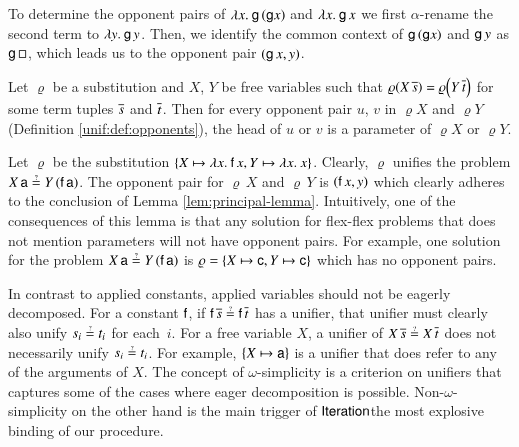 \begin{exa} To determine the opponent pairs of $\lambda x.\> \mathsf{g} \, (\mathsf{g} x)$
  and $\lambda x.\> \mathsf{g} \, x$ we first $\alpha$-rename the second term to 
  $\lambda y.\> \mathsf{g}\,{y}$. Then, we identify the common context of $\mathsf{g} \, (\mathsf{g} x)$ and $\mathsf{g} \, y$
  as $\mathsf{g} \, \square $, which leads us to the opponent pair $(\mathsf{g} \, x, y)$.
\end{exa}

\begin{lemma}[$\jp L{3\text{ (1)}}$]\label{lem:principal-lemma}Let $\varrho$ be a substitution
    and $X$, $Y$ be free variables such that $\varrho\left(X\,\seq s\right)=\varrho\left(Y\,\seq t\right)$
    for some term tuples $\overline{s}$ and $\overline{t}$. Then for every opponent
    pair $u$, $v$ in $\varrho X$ and $\varrho Y$
    (Definition \ref{unif:def:opponents}), the head of $u$ or $v$ is a parameter
    of $\varrho X$ or $\varrho Y$.
    \end{lemma}
\begin{exa}
  Let $\varrho$ be the substitution $\{ X \mapsto \lambda x.\> \mathsf{f} \, x, Y
  \mapsto \lambda x.\> x \}$. Clearly, $\varrho$ unifies the problem $X \, \cst{a}
  \unif Y \, (\cst{f} \, \cst{a})$. The opponent pair for $\varrho\,X$ and $\varrho\,Y$
  is $(\mathsf{f} \, x, y)$ which clearly adheres to the conclusion of Lemma \ref{lem:principal-lemma}.
%
  Intuitively, one of the consequences of this lemma is that any solution for
  flex-flex problems that does not mention parameters will not have opponent pairs. 
  For example, one solution for the 
  problem $X \, \cst{a}
  \unif Y \, (\cst{f} \, \cst{a})$ is $\varrho = \{ X \mapsto \mathsf{c}, Y \mapsto \mathsf{c} \}$
  which has no opponent pairs.
\end{exa}
  
  In contrast to applied constants, applied variables should not be eagerly decomposed.
  For a constant $\mathsf{f}$, if $\cst{f}\,\seq s \unif \cst{f}\,\seq t$ has a unifier,
  that unifier must clearly also unify $s_{i} \unif t_{i}$ for each~$i$. 
  For a free variable $X$, a unifier of $X\,\seq s \unif X\,\seq t$ does not necessarily
  unify $s_{i} \unif t_{i}$. For example, $\{X \mapsto \mathsf{a}\}$ is a unifier that does
  refer to any of the arguments of $X$.
  The concept of $\omega$-simplicity is
  a criterion on unifiers that captures some of the cases where eager decomposition is possible.
  Non-$\omega$-simplicity
  on the other hand is the main trigger of $\textsf{Iteration}$\textemdash the
  most explosive binding of our procedure.
  
